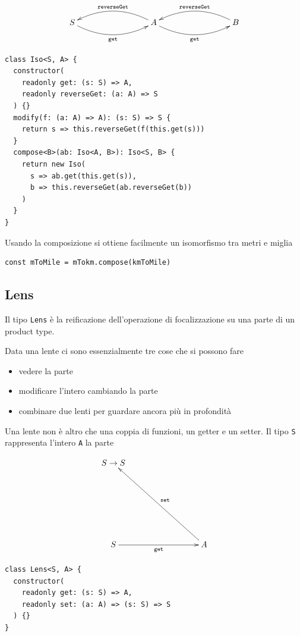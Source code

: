 \documentclass[12pt]{article}
\begin{document}
\[
\xymatrixrowsep{3cm}
\xymatrixcolsep{3cm}
\xymatrix{
  S \ar@/_0.5cm/[r]_{\texttt{get}} & A \ar@/_0.5cm/[l]_{\texttt{reverseGet}} \ar@/_0.5cm/[r]_{\texttt{get}} & B \ar@/_0.5cm/[l]_{\texttt{reverseGet}}
}
\]

\begin{verbatim}
class Iso<S, A> {
  constructor(
    readonly get: (s: S) => A,
    readonly reverseGet: (a: A) => S
  ) {}
  modify(f: (a: A) => A): (s: S) => S {
    return s => this.reverseGet(f(this.get(s)))
  }
  compose<B>(ab: Iso<A, B>): Iso<S, B> {
    return new Iso(
      s => ab.get(this.get(s)),
      b => this.reverseGet(ab.reverseGet(b))
    )
  }
}
\end{verbatim}

Usando la composizione si ottiene facilmente un isomorfismo tra metri e miglia

\begin{verbatim}
const mToMile = mTokm.compose(kmToMile)
\end{verbatim}

\subsection{Lens}

Il tipo \texttt{Lens} è la reificazione dell'operazione di focalizzazione su una parte di un product type.

Data una lente ci sono essenzialmente tre cose che si possono fare

\begin{itemize}
  \item vedere la parte
  \item modificare l'intero cambiando la parte
  \item combinare due lenti per guardare ancora più in profondità
\end{itemize}

Una lente non è altro che una coppia di funzioni, un getter e un setter. Il tipo \texttt{S} rappresenta l'intero \texttt{A} la parte

\[
\xymatrixrowsep{3cm}
\xymatrixcolsep{3cm}
\xymatrix{
  {S \rightarrow S} \\
  S \ar[r]_{\texttt{get}} & A \ar[lu]_{\texttt{set}}
}
\]

\begin{verbatim}
class Lens<S, A> {
  constructor(
    readonly get: (s: S) => A,
    readonly set: (a: A) => (s: S) => S
  ) {}
}
\end{verbatim}
\end{document}
